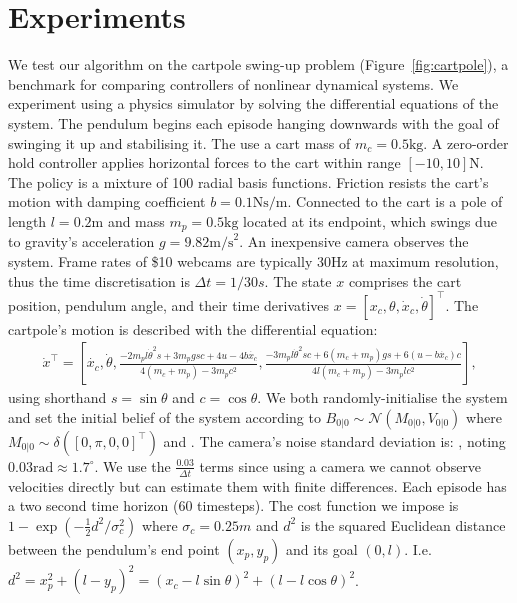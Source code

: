 \documentclass{article}
\newcommand{\N}{\mathcal{N}}
\newcommand{\pendulumangle}{\theta} %
\begin{document}
\section{Experiments}\label{sec:experiments}

We test our algorithm on the cartpole swing-up problem (Figure~\ref{fig:cartpole}),
a benchmark for comparing controllers of nonlinear dynamical systems.
We experiment using a physics simulator by solving the differential equations of the system.
The pendulum begins each episode hanging downwards
with the goal of swinging it up and stabilising it.
%
The use a cart mass of $m_c = 0.5\text{kg}$.
A zero-order hold controller applies horizontal forces to the cart within range $[-10,10]\text{N}$.
The policy is a mixture of 100 radial basis functions.
Friction resists the cart's motion with damping coefficient $b=0.1\text{Ns/m}$.
Connected to the cart is a pole of length $l=0.2\text{m}$
and mass $m_p = 0.5\text{kg}$ located at its endpoint,
which swings due to gravity's acceleration $g=9.82\text{m/s}^2$.
An inexpensive camera observes the system.
Frame rates of \$10 webcams are typically 30Hz at maximum resolution,
thus the time discretisation is $\Delta t = 1/30 s$.
%
The state $x$ comprises the cart position, pendulum angle, and
their time derivatives $x=[x_c,\pendulumangle,\dot x_c, \dot\pendulumangle]^\top$.
The cartpole's motion is described with the differential equation:
\begin{eqnarray}
\dot x^\top\!=\!\left[\dot{x_c},
\dot{\pendulumangle},
\frac{-2m_pl \dot{\pendulumangle}^2s\!+\!3m_pgsc\!+\!4u\!-\!4b\dot{x_c}}
{4(m_c\!+\!m_p)-3m_pc^2},
\frac{-3m_pl \dot{\pendulumangle}^2sc\!+\!6(m_c\!+\!m_p)gs\!+\!6(u\!-\!b\dot{x_c})c}
{4l(m_c\!+\!m_p)-3m_plc^2}\right],
\end{eqnarray}
using shorthand $s=\sin\pendulumangle$ and $c=\cos\pendulumangle$.
We both randomly-initialise the system and set the
initial belief of the system according to
$B_{0|0}\sim\N(M_{0|0},V_{0|0})$
where $M_{0|0} \sim \delta([0,\pi,0,0]^\top)$ and
.
%
The camera's noise standard deviation is:
, %
noting $0.03\text{rad}\approx 1.7^\circ$. %
We use the $\frac{0.03}{\Delta t}$ terms since using a camera we cannot observe velocities directly
but can estimate them with finite differences.%
Each episode has a two second time horizon (60 timesteps). %
%
The cost function %
we impose is
$1-\exp\left(-\frac{1}{2}d^2/\sigma_c^2\right)$
where $\sigma_c = 0.25m$
and $d^2$ is the squared Euclidean distance between the pendulum's end point $(x_p,y_p)$
and its goal $(0,l)$.
I.e. $d^2 = x_p^2 + (l-y_p)^2 = (x_c-l\sin\pendulumangle)^2 + (l-l\cos\pendulumangle)^2$.
\end{document}
